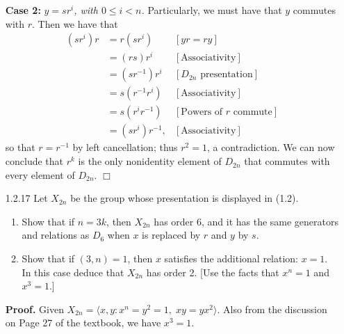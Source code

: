 \documentclass[9pt]{article}
\newcommand{\qed}{\hfill \ensuremath{\Box}}
\newcommand{\cyc}[1]{\langle #1 \rangle}
\begin{document}
\begin{enumerate}
      \textbf{Case 2:} \textit{$y = sr^i$, with $0 \le i < n$.} Particularly, we
      must have that $y$ commutes with $r$. Then we have that
      \begin{align*}
         (sr^i)r &= r(sr^i) &[yr = ry] \\
                 &= (rs)r^i &[\text{Associativity}] \\
                 &= (sr^{-1})r^i &[D_{2n}\text{ presentation}] \\
                 &= s(r^{-1}r^i) &[\text{Associativity}] \\
                 &= s(r^ir^{-1}) &[\text{Powers of $r$ commute}] \\
                 &= (sr^i)r^{-1}, &[\text{Associativity}]
      \end{align*}
      so that $r = r^{-1}$ by left cancellation; thus $r^2 = 1$, a
      contradiction. We can now conclude that $r^k$ is the only nonidentity
      element of $D_{2n}$ that commutes with every element of $D_{2n}$. \qed
   \item[1.2.17]  Let $X_{2n}$ be the group whose presentation
                                  is displayed in (1.2).
                  \begin{enumerate}
                     \item Show that if $n = 3k$, then $X_{2n}$ has order 6, and
                           it has the same generators and relations as $D_6$
                           when $x$ is replaced by $r$ and $y$ by $s$.
                     \item Show that if $(3, n) = 1$, then $x$ satisfies the
                           additional relation: $x = 1$. In this case deduce
                           that $X_{2n}$ has order 2. [Use the facts that
                           $x^n = 1$ and $x^3 = 1$.]
                  \end{enumerate}

      \textbf{Proof.} Given $X_{2n} = \cyc{x, y :  x^n = y^2 = 1, \;xy = yx^2}$.
      Also from the discussion on Page 27 of the textbook, we have $x^3 = 1$.


\end{enumerate}
\end{document}
